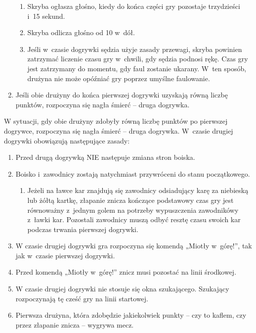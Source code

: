 \documentclass[12pt,a4paper]{article}
\renewcommand{\subsubsection}[1]{
  \oldsubsubsection{#1}%
  \leftskip1.5cm
}
\begin{document}
\begin{enumerate}
\begin{enumerate}
		      \item Skryba ogłasza głośno, kiedy do końca części gry pozostaje
		            trzydzieści i~15 sekund.

		      \item Skryba odlicza głośno od 10 w~dół.

		      \item Jeśli w~czasie dogrywki sędzia użyje zasady przewagi, skryba
		            powinien zatrzymać liczenie czasu gry w~chwili, gdy sędzia podnosi rękę.
		            Czas gry jest zatrzymany do momentu, gdy faul zostanie ukarany. W~ten
		            sposób, drużyna nie może opóźniać gry poprzez umyślne faulowanie.
	      \end{enumerate}

	\item Jeśli obie drużyny do końca pierwszej dogrywki uzyskają równą liczbę
	      punktów, rozpoczyna się nagła śmierć -- druga dogrywka.
\end{enumerate}

\subsubsection{Nagła śmierć -- druga dogrywka}
W sytuacji, gdy obie
drużyny zdobyły równą liczbę punktów po pierwszej dogrywce, rozpoczyna
się nagła śmierć -- druga dogrywka. W~czasie drugiej dogrywki obowiązują
następujące zasady:

\begin{enumerate}
	\item Przed drugą dogrywką NIE następuje zmiana stron boiska.

	\item Boisko i~zawodnicy zostają natychmiast przywróceni do stanu
	      początkowego.
	      \begin{enumerate}
		      \item Jeżeli na ławce kar znajdują się zawodnicy odsiadujący karę za
		            niebieską lub żółtą kartkę, złapanie znicza kończące podstawowy czas gry
		            jest równoważny z~jednym golem na potrzeby wypuszczenia zawodnikówy z~ławki kar. Pozostali zawodnicy muszą odbyć resztę czasu swoich kar
		            podczas trwania pierwszej dogrywki.
	      \end{enumerate}
	\item W czasie drugiej dogrywki gra rozpoczyna się komendą „Miotły w~górę!'', tak jak w~czasie pierwszej dogrywki.

	\item Przed komendą „Miotły w~górę!'' znicz musi pozostać na linii środkowej.

	\item W czasie drugiej dogrywki nie stosuje się okna szukającego. Szukający
	      rozpoczynają tę cześć gry na linii startowej.

	\item Pierwsza drużyna, która zdobędzie jakiekolwiek punkty -- czy to
	      kaflem, czy przez złapanie znicza -- wygrywa mecz.
\end{enumerate}
\end{document}
